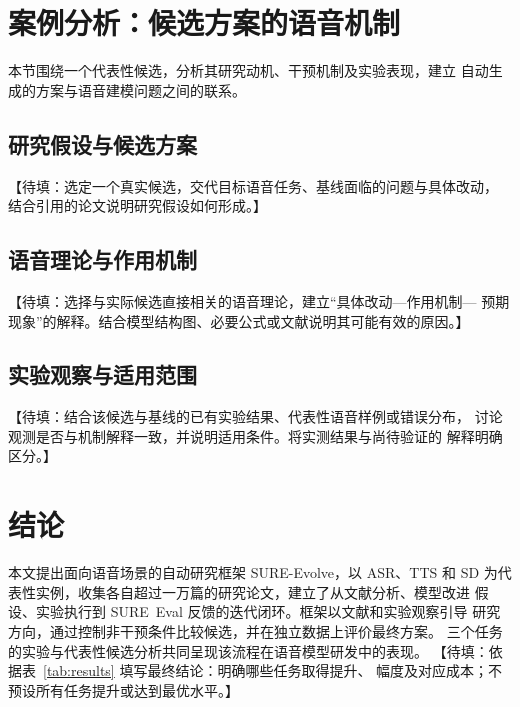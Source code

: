 \documentclass{article}
\newcommand{\pending}[1]{\textcolor{blue!65!black}{【待填：#1】}}
\begin{document}
\section{案例分析：候选方案的语音机制}
\label{sec:case}

本节围绕一个代表性候选，分析其研究动机、干预机制及实验表现，建立
自动生成的方案与语音建模问题之间的联系。

\subsection{研究假设与候选方案}

\pending{选定一个真实候选，交代目标语音任务、基线面临的问题与具体改动，
结合引用的论文说明研究假设如何形成。}

\subsection{语音理论与作用机制}

\pending{选择与实际候选直接相关的语音理论，建立“具体改动—作用机制—
预期现象”的解释。结合模型结构图、必要公式或文献说明其可能有效的原因。}

\subsection{实验观察与适用范围}

\pending{结合该候选与基线的已有实验结果、代表性语音样例或错误分布，
讨论观测是否与机制解释一致，并说明适用条件。将实测结果与尚待验证的
解释明确区分。}

\section{结论}
\label{sec:conclusion}

本文提出面向语音场景的自动研究框架 SURE-Evolve，以 ASR、TTS 和 SD
为代表性实例，收集各自超过一万篇的研究论文，建立了从文献分析、模型改进
假设、实验执行到 SURE~Eval 反馈的迭代闭环。框架以文献和实验观察引导
研究方向，通过控制非干预条件比较候选，并在独立数据上评价最终方案。
三个任务的实验与代表性候选分析共同呈现该流程在语音模型研发中的表现。
\pending{依据表~\ref{tab:results} 填写最终结论：明确哪些任务取得提升、
幅度及对应成本；不预设所有任务提升或达到最优水平。}

\clearpage
\balance
\begingroup
{}


\endgroup
\end{document}
